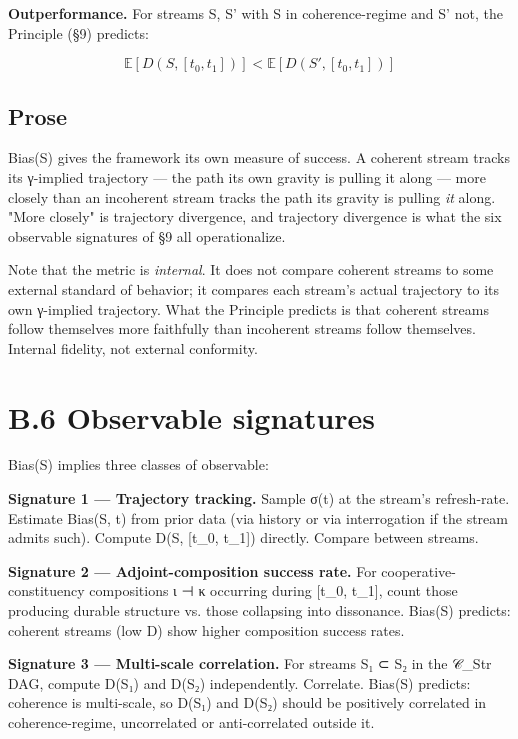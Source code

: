 \documentclass[11pt, openany]{book}
\newcommand{\sectionbreak}{\clearpage}
\begin{document}
\textbf{Outperformance.} For streams S, S' with S in coherence-regime and S' not, the Principle (§9) predicts:

$$\mathbb{E}[D(S, [t_0, t_1])] < \mathbb{E}[D(S', [t_0, t_1])]$$

\subsection{Prose}

Bias(S) gives the framework its own measure of success. A coherent stream tracks its γ-implied trajectory --- the path its own gravity is pulling it along --- more closely than an incoherent stream tracks the path its gravity is pulling \textit{it} along. "More closely" is trajectory divergence, and trajectory divergence is what the six observable signatures of §9 all operationalize.

Note that the metric is \textit{internal}. It does not compare coherent streams to some external standard of behavior; it compares each stream's actual trajectory to its own γ-implied trajectory. What the Principle predicts is that coherent streams follow themselves more faithfully than incoherent streams follow themselves. Internal fidelity, not external conformity.

\sectionbreak

\section{B.6 Observable signatures}

Bias(S) implies three classes of observable:

\textbf{Signature 1 --- Trajectory tracking.} Sample σ(t) at the stream's refresh-rate. Estimate Bias(S, t) from prior data (via history or via interrogation if the stream admits such). Compute D(S, [t\_\allowbreak{}0, t\_\allowbreak{}1]) directly. Compare between streams.

\textbf{Signature 2 --- Adjoint-composition success rate.} For cooperative-constituency compositions ι ⊣ κ occurring during [t\_\allowbreak{}0, t\_\allowbreak{}1], count those producing durable structure vs. those collapsing into dissonance. Bias(S) predicts: coherent streams (low D) show higher composition success rates.

\textbf{Signature 3 --- Multi-scale correlation.} For streams S₁ ⊂ S₂ in the 𝒞\_\allowbreak{}Str DAG, compute D(S₁) and D(S₂) independently. Correlate. Bias(S) predicts: coherence is multi-scale, so D(S₁) and D(S₂) should be positively correlated in coherence-regime, uncorrelated or anti-correlated outside it.
\end{document}
